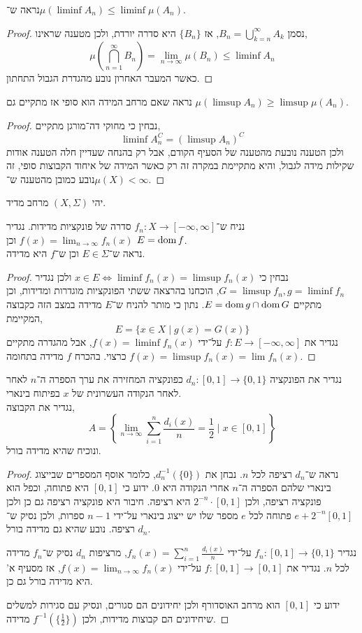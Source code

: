 \subquestion{}
נראה ש־$\mu(\liminf A_n) \le \liminf \mu(A_n)$.
\begin{proof}
	נסמן $B_n = \bigcup_{k = n}^\infty A_k$, אז $\{ B_n \}$ היא סדרה יורדת, ולכן מטענה שראינו,
	\[
		\mu(\bigcap_{n = 1}^\infty B_n)
		= \lim_{n \to \infty} \mu(B_n)
		\le \liminf A_n
	\]
	כאשר המעבר האחרון נובע מהגדרת הגבול התחתון.
\end{proof}

\subquestion{}
נראה שאם מרחב המידה הוא סופי אז מתקיים גם $\mu(\limsup A_n) \ge \limsup \mu(A_n)$.
\begin{proof}
	נבחין כי מחוקי דה־מורגן מתקיים,
	\[
		\liminf A_n^C = {(\limsup A_n)}^C
	\]
	ולכן הטענה נובעת מהטענה של הסעיף הקודם, אבל רק בהנחה שעדיין חלה הטענה אודות שקילות מידה לגבול, והיא מתקיימת במקרה זה רק כאשר המידה של איחוד הקבוצות סופי, זה נובע כמובן מהטענה ש־$\mu(X) < \infty$.
\end{proof}

\question{}
יהי $(X, \Sigma)$ מרחב מדיד.

\subquestion{}
נניח ש־$f_n : X \to [-\infty, \infty]$ סדרה של פונקציות מדידות.
נגדיר $f(x) = \lim_{n \to \infty} f_n(x)$ וכן $E = \operatorname{dom} f$. \\
נראה ש־$E \in \Sigma$ וכן ש־$f$ היא מדידה.
\begin{proof}
	נבחין כי $x \in E \iff \liminf f_n(x) = \limsup f_n(x)$ ולכן נגדיר $G = \limsup f_n, g = \liminf f_n$, הוכחנו בהרצאה ששתי הפונקציות מוגדרות ומדידות, וכן מתקיים $E = \operatorname{dom} g \cap \operatorname{dom} G$.
	נתון כי מותר להניח ש־$E$ מדידה במצב הזה כקבוצה המקיימת,
	\[
		E = \{ x \in X \mid g(x) = G(x) \}
	\]
	נגדיר את $f : E \to [-\infty, \infty]$ על־ידי $f(x) = \liminf f_n(x)$, אבל מהגדרה מתקיים $f(x) = \limsup f_n(x) = \lim f_n(x)$ כרצוי.
	בהכרח $f$ מדידה בתחומה.
\end{proof}

\subquestion{}
נגדיר את הפונקציה $d_n : [0, 1] \to \{0, 1\}$ כפונקציה המחזירה את ערך הספרה ה־$n$ לאחר לאחר הנקודה העשרונית של $x$ בפיתוח בינארי. \\
נגדיר את הקבוצה,
\[
	A = \left\{ \lim_{n \to \infty} \sum_{i = 1}^n \frac{d_i(x)}{n} = \frac{1}{2} \mid x \in [0, 1] \right\}
\]
ונוכיח שהיא מדידה בורל.
\begin{proof}
	נראה ש־$d_n$ רציפה לכל $n$.
	נבחן את $d_n^{-1}(\{ 0 \})$, כלומר אוסף המספרים שבייצוג בינארי שלהם הספרה ה־$n$ אחרי הנקודה היא $0$.
	ידוע כי $[0, 1]$ היא פתוחה, וכפל הוא פונקציה רציפה, ולכן $2^{-n} \cdot [0, 1]$ היא רציפה.
	חיבור היא פונקציה רציפה גם כן ולכן $e + 2^{-n} [0, 1]$ פתוחה לכל $e$ מספר שלו יש ייצוג בינארי על־ידי $n - 1$ ספרות, ולכן נסיק ש־$d_n$ רציפה.
	נובע שהיא גם מדידה בורל.

	נגדיר $f_n : [0, 1] \to \{0, 1\}$ על־ידי $f_n(x) = \sum_{i = 1}^n \frac{d_i(x)}{n}$, מרציפות $d_n$ נסיק ש־$f_n$ מדידה לכל $n$.
	נגדיר את $f : [0, 1] \to [0, 1]$ על־ידי $f(x) = \lim_{n \to \infty} f_n(x)$, אז מסעיף א' היא מדידה בורל גם כן.

	ידוע כי $[0, 1]$ הוא מרחב האוסדורף ולכן יחידונים הם סגורים, ונסיק עם סגירות למשלים שיחידונים הם קבוצות מדידות, ולכן $f^{-1}(\{ \frac{1}{2} \})$ מדידה.
\end{proof}

